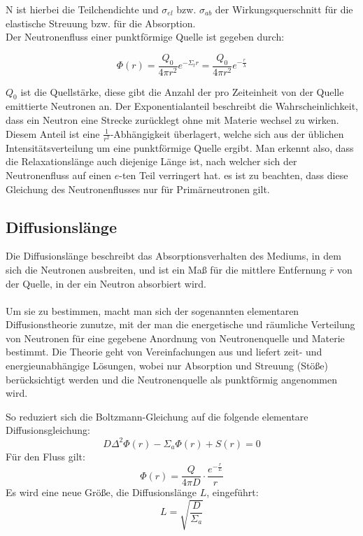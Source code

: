 \documentclass[a4paper,titlepage]{scrartcl}
\numberwithin{equation}{section}
\begin{document}
N ist hierbei die Teilchendichte und $\sigma_{el}$ bzw. $\sigma_{ab}$ der Wirkungsquerschnitt für die elastische Streuung bzw. für die Absorption.\\
Der Neutronenfluss einer punktförmige Quelle ist gegeben durch:

\begin{equation}
\Phi (r) = \frac{Q_0}{4 \pi r^2} e^{-\Sigma_t r}=\frac{Q_0}{4 \pi r^2} e^{-\frac{r}{\lambda}}
\label{eq:flussSchnell}
\end{equation}

$Q_0$ ist die Quellstärke, diese gibt die Anzahl der pro Zeiteinheit von der Quelle emittierte Neutronen an. Der Exponentialanteil beschreibt die Wahrscheinlichkeit, dass ein Neutron eine Strecke zurücklegt ohne mit Materie wechsel zu wirken. Diesem Anteil ist eine $\frac{1}{r^2}$-Abhängigkeit überlagert, welche sich aus der üblichen Intensitätsverteilung um eine punktförmige Quelle ergibt. Man erkennt also, dass die Relaxationslänge auch diejenige Länge ist, nach welcher sich der Neutronenfluss auf einen $e$-ten Teil verringert hat. es ist zu beachten, dass diese Gleichung des Neutronenflusses nur für Primärneutronen gilt.

\subsection{Diffusionslänge}
Die Diffusionslänge beschreibt das Absorptionsverhalten des Mediums, in dem sich die Neutronen ausbreiten, und ist ein Maß für die mittlere Entfernung $\overline{r}$ von der Quelle, in der ein Neutron absorbiert wird.\\ \\
Um sie zu bestimmen, macht man sich der sogenannten elementaren Diffusionstheorie zunutze, mit der man die energetische und räumliche Verteilung von Neutronen für eine gegebene Anordnung von Neutronenquelle und Materie bestimmt. Die Theorie geht von Vereinfachungen aus und liefert zeit- und energieunabhängige Lösungen, wobei nur Absorption und Streuung (Stöße) berücksichtigt werden und die Neutronenquelle als punktförmig angenommen wird. 

So reduziert sich die Boltzmann-Gleichung auf die folgende elementare Diffusionsgleichung:
\begin{equation}
\label{eq:boltzmann}
D \Delta^2 \Phi(r) - \Sigma_a \Phi(r) + S(r) = 0
\end{equation}
Für den Fluss gilt:
\begin{equation}
\label{eq:flussThermisch}
\Phi(r)=\frac{Q}{4 \pi D} \cdot \frac{e^{-\frac{r}{L}}}{r}
\end{equation}
Es wird eine neue Größe, die Diffusionslänge $L$, eingeführt:
\begin{equation*}
L=\sqrt{\frac{D}{\Sigma_a}}
\end{equation*}
\end{document}
